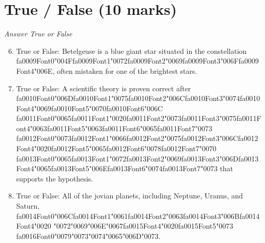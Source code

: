 \documentclass[12pt]{article}
\begin{document}
\section*{True / False (10 marks)}
\textit{Answer True or False}
\begin{enumerate}[label=\arabic*.]
\setcounter{enumi}{5}
\item True or False: Betelgeuse is a blue giant star situated in the constellation {\csname fa0009Font0\endcsname\char"004F}{\csname fa0009Font1\endcsname\char"0072}{\csname fa0009Font2\endcsname\char"0069}{\csname fa0009Font3\endcsname\char"006F}{\csname fa0009Font4\endcsname\char"006E}, often mistaken for one of the brightest stars.
\item True or False: A scientific theory is proven correct after {\csname fa0010Font0\endcsname\char"006D}{\csname fa0010Font1\endcsname\char"0075}{\csname fa0010Font2\endcsname\char"006C}{\csname fa0010Font3\endcsname\char"0074}{\csname fa0010Font4\endcsname\char"0069}{\csname fa0010Font5\endcsname\char"0070}{\csname fa0010Font6\endcsname\char"006C} {\csname fa0011Font0\endcsname\char"0065}{\csname fa0011Font1\endcsname\char"0020}{\csname fa0011Font2\endcsname\char"0073}{\csname fa0011Font3\endcsname\char"0075}{\csname fa0011Font4\endcsname\char"0063}{\csname fa0011Font5\endcsname\char"0063}{\csname fa0011Font6\endcsname\char"0065}{\csname fa0011Font7\endcsname\char"0073} {\csname fa0012Font0\endcsname\char"0073}{\csname fa0012Font1\endcsname\char"0066}{\csname fa0012Font2\endcsname\char"0075}{\csname fa0012Font3\endcsname\char"006C}{\csname fa0012Font4\endcsname\char"0020}{\csname fa0012Font5\endcsname\char"0065}{\csname fa0012Font6\endcsname\char"0078}{\csname fa0012Font7\endcsname\char"0070} {\csname fa0013Font0\endcsname\char"0065}{\csname fa0013Font1\endcsname\char"0072}{\csname fa0013Font2\endcsname\char"0069}{\csname fa0013Font3\endcsname\char"006D}{\csname fa0013Font4\endcsname\char"0065}{\csname fa0013Font5\endcsname\char"006E}{\csname fa0013Font6\endcsname\char"0074}{\csname fa0013Font7\endcsname\char"0073} that supports the hypothesis.
\item True or False: All of the jovian planets, including Neptune, Uranus, and Saturn, {\csname fa0014Font0\endcsname\char"006C}{\csname fa0014Font1\endcsname\char"0061}{\csname fa0014Font2\endcsname\char"0063}{\csname fa0014Font3\endcsname\char"006B}{\csname fa0014Font4\endcsname\char"0020} {\char"0072}{\char"0069}{\char"006E}{\char"0067}{\csname fa0015Font4\endcsname\char"0020}{\csname fa0015Font5\endcsname\char"0073} {\csname fa0016Font0\endcsname\char"0079}{\char"0073}{\char"0074}{\char"0065}{\char"006D}{\char"0073}.

\end{enumerate}
\end{document}
